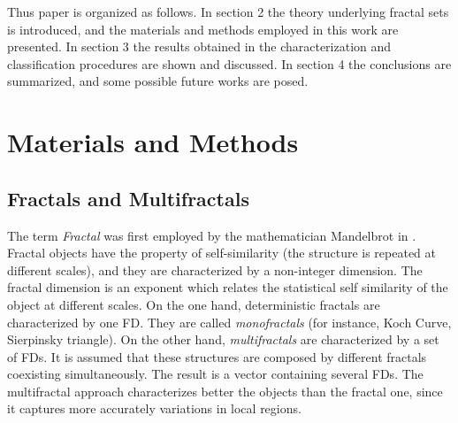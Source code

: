 Thus paper is organized as follows. In section 2 the theory underlying fractal sets is introduced, and the materials and methods employed in this work are presented. In section 3 the results obtained in the characterization and classification procedures are shown and discussed. In section 4 the conclusions are summarized, and some possible future works are posed.


\section{Materials and Methods}
\label{sec:1}
\subsection{Fractals and Multifractals}
\label{sec:2}

The term {\em Fractal} was first employed by the mathematician Mandelbrot in \cite{Mandelbrot83}. Fractal objects have the property of self-similarity (the structure is repeated at different scales), and they are characterized by a non-integer dimension. The fractal dimension is an exponent which relates the statistical self similarity of the object at different scales. On the one hand, deterministic fractals are characterized by one FD. They are called {\em monofractals} (for instance, Koch Curve, Sierpinsky triangle). On the other hand, {\em multifractals} \cite{Mandelbrot89} are characterized by a set of FDs. It is assumed that these structures are composed by different fractals coexisting simultaneously. The result is a vector containing several FDs. The multifractal approach characterizes better the objects than the fractal one, since it captures more accurately variations in local regions.


